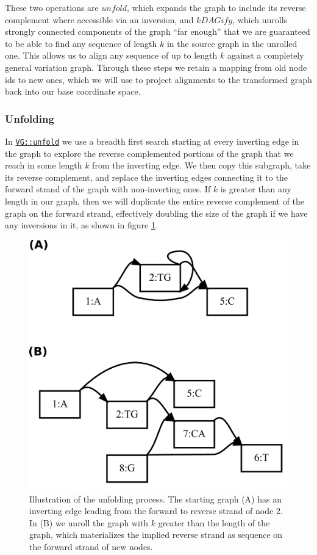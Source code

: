 \documentclass[12pt]{article}
\begin{document}
These two operations are $unfold$, which expands the graph to include its reverse complement where accessible via an inversion, and $kDAGify$, which unrolls strongly connected components of the graph ``far enough'' that we are guaranteed to be able to find any sequence of length $k$ in the source graph in the unrolled one.
This allows us to align any sequence of up to length $k$ against a completely general variation graph.
Through these steps we retain a mapping from old node ids to new ones, which we will use to project alignments to the transformed graph back into our base coordinate space.

\subsubsection{Unfolding}

In \href{https://github.com/vgteam/vg/blob/fbcb6e62/src/vg.cpp#L8289-L8400}{{\tt VG::unfold}} we use a breadth first search starting at every inverting edge in the graph to explore the reverse complemented portions of the graph that we reach in some length $k$ from the inverting edge.
We then copy this subgraph, take its reverse complement, and replace the inverting edges connecting it to the forward strand of the graph with non-inverting ones.
If $k$ is greater than any length in our graph, then we will duplicate the entire reverse complement of the graph on the forward strand, effectively doubling the size of the graph if we have any inversions in it, as shown in figure \ref{fig:unfold}.

\begin{figure}[t]
\centering
\includegraphics[width=1.0\textwidth]{figures/unfold}
\caption{\label{fig:unfold}
  Illustration of the unfolding process. The starting graph (A) has an inverting edge leading from the forward to reverse strand of node 2.
  In (B) we unroll the graph with $k$ greater than the length of the graph, which materializes the implied reverse strand as sequence on the forward strand of new nodes.
}
\end{figure}
\end{document}
